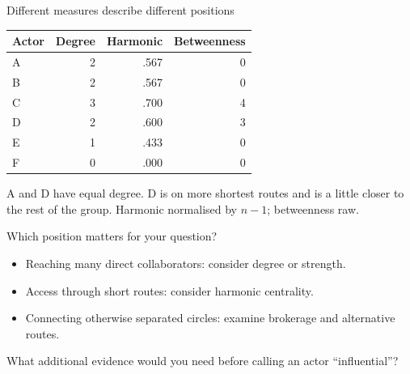 \documentclass[aspectratio=169,11pt]{beamer}
\begin{document}
\begin{frame}{Different measures describe different positions}

\begin{center}\begin{tabular}{lrrr}
\toprule
Actor & Degree & Harmonic & Betweenness\\\midrule
A & 2 & .567 & 0\\
B & 2 & .567 & 0\\
C & 3 & .700 & 4\\
D & 2 & .600 & 3\\
E & 1 & .433 & 0\\
F & 0 & .000 & 0\\\bottomrule
\end{tabular}\end{center}
A and D have equal degree. D is on more shortest routes and is a little closer to the rest of the group.
\medskip
{\footnotesize Harmonic normalised by $n-1$; betweenness raw.}


\end{frame}

\begin{frame}{Which position matters for your question?}

\begin{itemize}
\item Reaching many direct collaborators: consider degree or strength.
\medskip\item Access through short routes: consider harmonic centrality.
\medskip\item Connecting otherwise separated circles: examine brokerage and alternative routes.
\end{itemize}
What additional evidence would you need before calling an actor ``influential''?


\end{frame}
\end{document}

